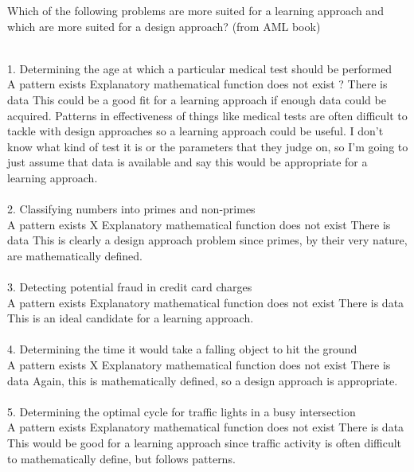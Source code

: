 \documentclass[draft]{exam} %
\theoremstyle{definition} \newtheorem*{defn}{Definition}
\begin{document}
\begin{questions}
\question Which of the following problems are more suited for a learning approach and which are more suited for
a design approach? (from AML book)\\
\begin{solution} \\%
1. Determining the age at which a particular medical test should be performed\\
 \checkmark A pattern exists \qquad  \checkmark Explanatory mathematical function does not exist \qquad ? There is data
This could be a good fit for a learning approach if enough data could be acquired.  Patterns in effectiveness of things like medical tests are often difficult to tackle with design approaches so a learning approach could be useful.  I don't know what kind of test it is or the parameters that they judge on, so I'm going to just assume that data is available and say this would be appropriate for a learning approach.
\\\\
2. Classifying numbers into primes and non-primes\\
 \checkmark A pattern exists \qquad  X Explanatory mathematical function does not exist \qquad  \checkmark There is data
This is clearly a design approach problem since primes, by their very nature, are mathematically defined.
\\\\
3. Detecting potential fraud in credit card charges\\
 \checkmark A pattern exists \qquad  \checkmark Explanatory mathematical function does not exist \qquad  \checkmark There is data
This is an ideal candidate for a learning approach.
\\\\
4. Determining the time it would take a falling object to hit the ground\\
 \checkmark A pattern exists \qquad  X Explanatory mathematical function does not exist \qquad  \checkmark There is data
Again, this is mathematically defined, so a design approach is appropriate.
\\\\
5. Determining the optimal cycle for traffic lights in a busy intersection\\
 \checkmark A pattern exists \qquad  \checkmark Explanatory mathematical function does not exist \qquad  \checkmark There is data
This would be good for a learning approach since traffic activity is often difficult to mathematically define, but follows patterns.
\end{solution} %


\end{questions}
\end{document}
